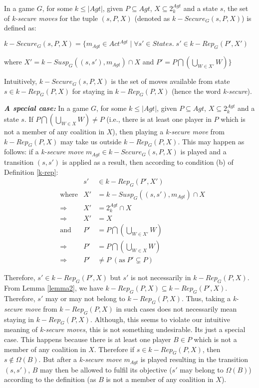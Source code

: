 \begin{definition}
\label{k-securemove}
In a game $G$, for some $k \leq \vert Agt \vert$, given $P \subseteq Agt$, $X \subseteq 2^{Agt}_{k}$ and a state $s$, the set of \textit{k-secure moves} for the tuple $(s, P, X)$ (denoted as $k-Secure_{G}(s, P, X)$) is defined as:

$k-Secure_{G}(s, P, X) = \bigg\lbrace m_{Agt} \in Act^{Agt} \; \bigg\vert \; \forall s' \in States. \; s' \in k-Rep_{G}(P', X')$

where $X' = k-Susp_{G}((s, s'), m_{Agt}) \cap X$ and $P' = P \bigcap \left( \bigcup \limits_{W \in X'}W \right)\bigg\rbrace$
\end{definition}

Intuitively, $k-Secure_{G}(s, P, X)$ is the set of moves available from state $s \in k-Rep_{G}(P, X)$ for staying in $k-Rep_{G}(P, X)$ (hence the word \textit{k-secure}).

\textit{\textbf{A special case:}} In a game $G$, for some $k \leq \vert Agt \vert$, given $P \subseteq Agt$, $X \subseteq 2^{Agt}_{k}$ and a state $s$. If $P \bigcap \left( \bigcup \limits_{W \in X}W \right) \neq P$ (i.e., there is at least one player in $P$ which is not a member of any coalition in $X$), then playing a \textit{k-secure move} from $k-Rep_{G}(P, X)$ may take us outside $k-Rep_{G}(P, X)$. This may happen as follows: if a \textit{k-secure move} $m_{Agt} \in k-Secure_{G}(s, P, X)$ is played and a transition $(s, s')$ is applied as a result, then according to condition (b) of Definition \ref{k-rep}:
\begin{align*}
&\qquad & s' &\in k-Rep_{G}(P', X')\\
&\text{where} & X' &= k-Susp_{G}((s, s'), m_{Agt}) \cap X\\
&\Rightarrow & X' &= 2^{Agt}_{k} \cap X\\
&\Rightarrow & X' &= X\\
&\text{and} & P' &= P \bigcap \left( \bigcup \limits_{W \in X'}W \right)\\
&\Rightarrow & P' &= P \bigcap \left( \bigcup \limits_{W \in X}W \right)\\
&\Rightarrow & P' &\neq P \; (\text{as} \; P' \subsetneq P)
\end{align*}

Therefore, $s' \in k-Rep_{G}(P', X)$ but $s'$ is not necessarily in $k-Rep_{G}(P, X)$. From Lemma \ref{lemma2}, we have $k-Rep_{G}(P, X) \subseteq k-Rep_{G}(P', X)$. Therefore, $s'$ may or may not belong to $k-Rep_{G}(P, X)$. Thus, taking a \textit{k-secure move} from $k-Rep_{G}(P, X)$ in such cases does not necessarily mean staying in $k-Rep_{G}(P, X)$. Although, this seems to violate our intuitive meaning of \textit{k-secure moves}, this is not something undesirable. Its just a special case. This happens because there is at least one player $B \in P$ which is not a member of any coalition in $X$. Therefore if $s \in k-Rep_{G}(P, X)$, then $s \notin \Omega(B)$. But after a \textit{k-secure move} $m_{Agt}$ is played resulting in the transition $(s, s')$, $B$ may then be allowed to fulfil its objective ($s'$ may belong to $\Omega(B)$) according to the definition (as $B$ is not a member of any coalition in $X$).


